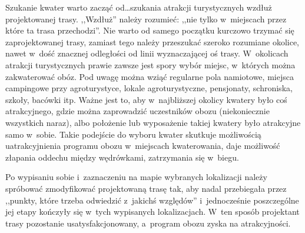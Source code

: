 \documentclass[a5paper,10pt,titlepage,twoside]{article}
\begin{document}
Szukanie kwater warto zacząć od\ldots szukania atrakcji turystycznych wzdłuż projektowanej trasy. ,,Wzdłuż'' należy rozumieć: ,,nie tylko w~miejscach przez które ta trasa przechodzi''. Nie warto od samego początku kurczowo trzymać się zaprojektowanej trasy, zamiast tego należy przeszukać szeroko rozumiane okolice, nawet w~dość znacznej odległości od linii wyznaczającej oś trasy. W~okolicach atrakcji turystycznych prawie zawsze jest spory wybór miejsc, w~których można zakwaterować obóz. Pod uwagę można wziąć regularne pola namiotowe, miejsca campingowe przy agroturystyce, lokale agroturystyczne, pensjonaty, schroniska, szkoły, bacówki itp. Ważne jest to, aby w~najbliższej okolicy kwatery było coś atrakcyjnego, gdzie można zaprowadzić uczestników obozu (niekoniecznie wszystkich naraz), albo położenie lub wyposażenie takiej kwatery było atrakcyjne samo w~sobie. Takie podejście do wyboru kwater skutkuje możliwością uatrakcyjnienia programu obozu w~miejscach kwaterowania, daje możliwość złapania oddechu między wędrówkami, zatrzymania się w~biegu.

Po wypisaniu sobie i~zaznaczeniu na mapie wybranych lokalizacji należy spróbować zmodyfikować projektowaną trasę tak, aby nadal przebiegała przez ,,punkty, które trzeba odwiedzić z~jakichś względów'' i~jednocześnie poszczególne jej etapy kończyły się w~tych wypisanych lokalizacjach. W~ten sposób projektant trasy pozostanie usatysfakcjonowany, a~program obozu zyska na atrakcyjności.
\end{document}

